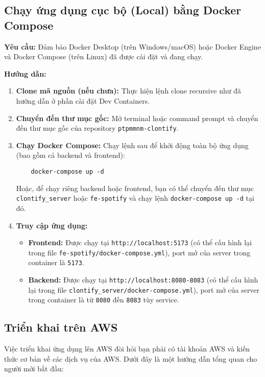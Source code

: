 \subsection{Chạy ứng dụng cục bộ (Local) bằng Docker Compose}
\label{subsec:local_deployment}

\textbf{Yêu cầu:} Đảm bảo Docker Desktop (trên Windows/macOS) hoặc Docker Engine và Docker Compose (trên Linux) đã được cài đặt và đang chạy.

\textbf{Hướng dẫn:}
\begin{enumerate}
    \item \textbf{Clone mã nguồn (nếu chưa):} Thực hiện lệnh clone recursive như đã hướng dẫn ở phần cài đặt Dev Containers.
    \item \textbf{Chuyển đến thư mục gốc:} Mở terminal hoặc command prompt và chuyển đến thư mục gốc của repository \texttt{ptpmmnm-clontify}.
    \item \textbf{Chạy Docker Compose:} Chạy lệnh sau để khởi động toàn bộ ứng dụng (bao gồm cả backend và frontend):
    \begin{verbatim}
    docker-compose up -d
    \end{verbatim}
    Hoặc, để chạy riêng backend hoặc frontend, bạn có thể chuyển đến thư mục \texttt{clontify\_server} hoặc \texttt{fe-spotify} và chạy lệnh \texttt{docker-compose up -d} tại đó.
    \item \textbf{Truy cập ứng dụng:}
    \begin{itemize}
        \item \textbf{Frontend:} Được chạy tại \texttt{http://localhost:5173} (có thể cấu hình lại trong file \texttt{fe-spotify/docker-compose.yml}), port mở của server trong container là \texttt{5173}.
        \item \textbf{Backend:} Được chạy tại \texttt{http://localhost:8080-8083} (có thể cấu hình lại trong file \texttt{clontify\_server/docker-compose.yml}), port mở của server trong container là từ \texttt{8080} đến \texttt{8083} tùy service.
    \end{itemize}
\end{enumerate}

\subsection{Triển khai trên AWS}
\label{subsec:aws_deployment}

Việc triển khai ứng dụng lên AWS đòi hỏi bạn phải có tài khoản AWS và kiến thức cơ bản về các dịch vụ của AWS. Dưới đây là một hướng dẫn tổng quan cho người mới bắt đầu:

